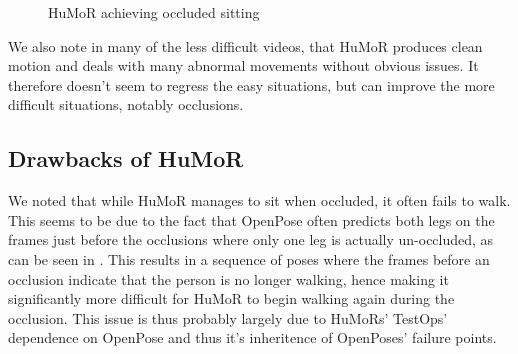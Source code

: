 \begin{figure}[h!]
    \centering
    \hfil
    \hfil
    \caption{HuMoR achieving occluded sitting}
    \label{fig:humor_sitting}
\end{figure}

We also note in many of the less difficult videos, that HuMoR produces clean motion and deals with many abnormal movements without obvious issues. It therefore doesn't seem to regress the easy situations, but can improve the more difficult situations, notably occlusions.


\subsection{Drawbacks of HuMoR}

We noted that while HuMoR manages to sit when occluded, it often fails to walk. This seems to be due to the fact that OpenPose often predicts both legs on the frames just before the occlusions where only one leg is actually un-occluded, as can be seen in . This results in a sequence of poses where the frames before an occlusion indicate that the person is no longer walking, hence making it significantly more difficult for HuMoR to begin walking again during the occlusion. This issue is thus probably largely due to HuMoRs' TestOps' dependence on OpenPose and thus it's inheritence of OpenPoses' failure points.

